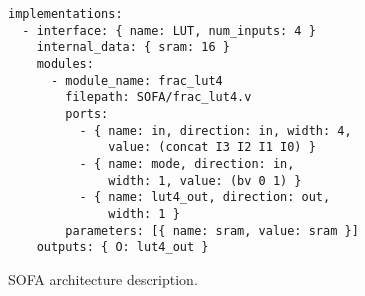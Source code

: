 \begin{figure}
\begin{verbatim}
implementations:
  - interface: { name: LUT, num_inputs: 4 }
    internal_data: { sram: 16 }
    modules:
      - module_name: frac_lut4
        filepath: SOFA/frac_lut4.v
        ports:
          - { name: in, direction: in, width: 4, 
              value: (concat I3 I2 I1 I0) }
          - { name: mode, direction: in,
              width: 1, value: (bv 0 1) }
          - { name: lut4_out, direction: out,
              width: 1 }
        parameters: [{ name: sram, value: sram }]
    outputs: { O: lut4_out }
    \end{verbatim}
    \caption{
SOFA architecture description.
  }
    \label{fig:sofa-architecture-description}
\end{figure}

